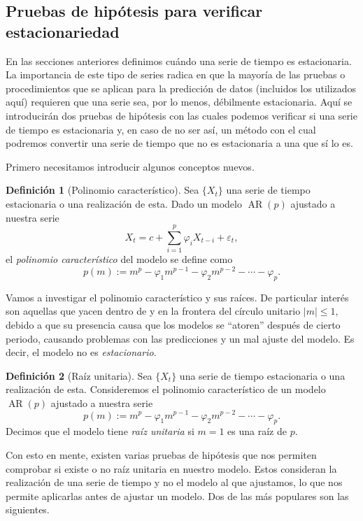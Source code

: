 \documentclass[11pt,letterpaper]{article}
\newcommand{\AR}{\ensuremath{\operatorname{AR}}}
\theoremstyle{definition}
\newtheorem{definition}{Definición}[section]
\theoremstyle{theorem}
\theoremstyle{remark}
\begin{document}
	\subsection{Pruebas de hipótesis para verificar estacionariedad}
	\noindent En las secciones anteriores definimos cuándo una serie de tiempo es estacionaria. La importancia de este tipo de series radica en que la mayoría de las pruebas o procedimientos que se aplican para la predicción de datos (incluidos los utilizados aquí) requieren que una serie sea, por lo menos, débilmente estacionaria. Aquí se introducirán dos pruebas de hipótesis con las cuales podemos verificar si una serie de tiempo es estacionaria y, en caso de no ser así, un método con el cual podremos convertir una serie de tiempo que no es estacionaria a una que sí lo es. \par
	Primero necesitamos introducir algunos conceptos nuevos.
	\begin{definition}[Polinomio característico]
		Sea \(\{X_t\}\) una serie de tiempo estacionaria o una realización de esta. Dado un modelo \(\AR(p)\) ajustado a nuestra serie \[X_t=c+\sum_{i=1}^{p}\varphi_iX_{t-i}+\varepsilon_t,\] el \textit{polinomio característico} del modelo se define como \[p(m):=m^p-\varphi_1m^{p-1}-\varphi_2m^{p-2}-\cdots-\varphi_p.\]
	\end{definition}
	Vamos a investigar el polinomio característico y sus raíces. De particular interés son aquellas que yacen dentro de y en la frontera del círculo unitario \(|m|\leq1\), debido a que su presencia causa que los modelos se ``atoren'' después de cierto periodo, causando problemas con las predicciones y un mal ajuste del modelo. Es decir, el modelo no es \textit{estacionario}.
	\begin{definition}[Raíz unitaria]
		Sea \(\{X_t\}\) una serie de tiempo estacionaria o una realización de esta. Consideremos el polinomio característico de un modelo \(\AR(p)\) ajustado a nuestra serie \[p(m):=m^p-\varphi_1m^{p-1}-\varphi_2m^{p-2}-\cdots- \varphi_p.\] Decimos que el modelo tiene \textit{raíz unitaria} si \(m=1\) es una raíz de \(p\).
	\end{definition}
	Con esto en mente, existen varias pruebas de hipótesis que nos permiten comprobar si existe o no raíz unitaria en nuestro modelo. Estos consideran la realización de una serie de tiempo y no el modelo al que ajustamos, lo que nos permite aplicarlas antes de ajustar un modelo. Dos de las más populares son las siguientes.
\end{document}
